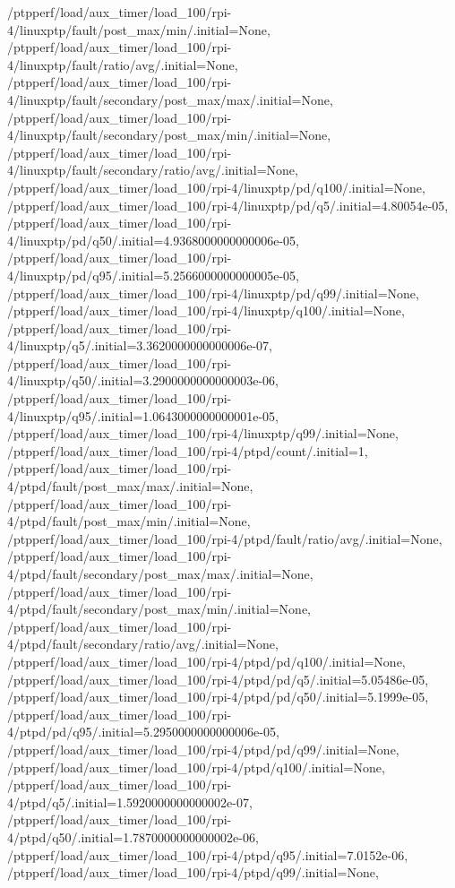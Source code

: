 {    /ptpperf/load/aux_timer/load_100/rpi-4/linuxptp/fault/post_max/min/.initial=None,
    /ptpperf/load/aux_timer/load_100/rpi-4/linuxptp/fault/ratio/avg/.initial=None,
    /ptpperf/load/aux_timer/load_100/rpi-4/linuxptp/fault/secondary/post_max/max/.initial=None,
    /ptpperf/load/aux_timer/load_100/rpi-4/linuxptp/fault/secondary/post_max/min/.initial=None,
    /ptpperf/load/aux_timer/load_100/rpi-4/linuxptp/fault/secondary/ratio/avg/.initial=None,
    /ptpperf/load/aux_timer/load_100/rpi-4/linuxptp/pd/q100/.initial=None,
    /ptpperf/load/aux_timer/load_100/rpi-4/linuxptp/pd/q5/.initial=4.80054e-05,
    /ptpperf/load/aux_timer/load_100/rpi-4/linuxptp/pd/q50/.initial=4.9368000000000006e-05,
    /ptpperf/load/aux_timer/load_100/rpi-4/linuxptp/pd/q95/.initial=5.2566000000000005e-05,
    /ptpperf/load/aux_timer/load_100/rpi-4/linuxptp/pd/q99/.initial=None,
    /ptpperf/load/aux_timer/load_100/rpi-4/linuxptp/q100/.initial=None,
    /ptpperf/load/aux_timer/load_100/rpi-4/linuxptp/q5/.initial=3.3620000000000006e-07,
    /ptpperf/load/aux_timer/load_100/rpi-4/linuxptp/q50/.initial=3.2900000000000003e-06,
    /ptpperf/load/aux_timer/load_100/rpi-4/linuxptp/q95/.initial=1.0643000000000001e-05,
    /ptpperf/load/aux_timer/load_100/rpi-4/linuxptp/q99/.initial=None,
    /ptpperf/load/aux_timer/load_100/rpi-4/ptpd/count/.initial=1,
    /ptpperf/load/aux_timer/load_100/rpi-4/ptpd/fault/post_max/max/.initial=None,
    /ptpperf/load/aux_timer/load_100/rpi-4/ptpd/fault/post_max/min/.initial=None,
    /ptpperf/load/aux_timer/load_100/rpi-4/ptpd/fault/ratio/avg/.initial=None,
    /ptpperf/load/aux_timer/load_100/rpi-4/ptpd/fault/secondary/post_max/max/.initial=None,
    /ptpperf/load/aux_timer/load_100/rpi-4/ptpd/fault/secondary/post_max/min/.initial=None,
    /ptpperf/load/aux_timer/load_100/rpi-4/ptpd/fault/secondary/ratio/avg/.initial=None,
    /ptpperf/load/aux_timer/load_100/rpi-4/ptpd/pd/q100/.initial=None,
    /ptpperf/load/aux_timer/load_100/rpi-4/ptpd/pd/q5/.initial=5.05486e-05,
    /ptpperf/load/aux_timer/load_100/rpi-4/ptpd/pd/q50/.initial=5.1999e-05,
    /ptpperf/load/aux_timer/load_100/rpi-4/ptpd/pd/q95/.initial=5.2950000000000006e-05,
    /ptpperf/load/aux_timer/load_100/rpi-4/ptpd/pd/q99/.initial=None,
    /ptpperf/load/aux_timer/load_100/rpi-4/ptpd/q100/.initial=None,
    /ptpperf/load/aux_timer/load_100/rpi-4/ptpd/q5/.initial=1.5920000000000002e-07,
    /ptpperf/load/aux_timer/load_100/rpi-4/ptpd/q50/.initial=1.7870000000000002e-06,
    /ptpperf/load/aux_timer/load_100/rpi-4/ptpd/q95/.initial=7.0152e-06,
    /ptpperf/load/aux_timer/load_100/rpi-4/ptpd/q99/.initial=None,
}
